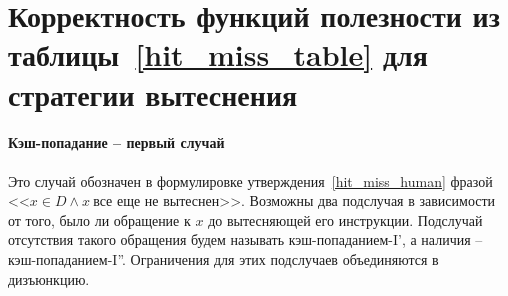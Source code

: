 \section*{Корректность функций полезности из таблицы~\ref{hit_miss_table}
для стратегии вытеснения \LRU}

\paragraph{Кэш-попадание -- первый случай} Это случай обозначен в
формулировке утверждения~\ref{hit_miss_human} фразой <<$x \in D
\wedge x~\mbox{все еще не вытеснен}$>>. Возможны два подслучая в
зависимости от того, было ли обращение к $x$ до вытесняющей его
инструкции. Подслучай отсутствия такого обращения будем называть
кэш-попаданием-I', а наличия -- кэш-попаданием-I''. Ограничения для
этих подслучаев объединяются в дизъюнкцию.

